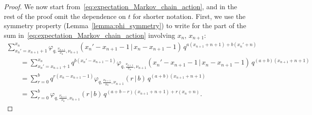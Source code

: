 \begin{proof}
	We now start from~\eqref{eq:expectation_Markov_chain_action}, and
	in the rest of the proof omit the dependence on $t$ for shorter notation.
	First, we use the symmetry property (Lemma~\ref{lemma:phi_symmetry})
	to write for the part of the sum in~\eqref{eq:expectation_Markov_chain_action}
	involving $x_n$, $x_{n+1}$:
	\begin{gather}
	\sum_{x_n'=x_{n+1}+1}^{x_n}
	\varphi_{q,\frac{\nu_{n+1}}{\nu_n},\nu_{n+1}}(x_n'-x_{n+1}-1\,|\, x_n-x_{n+1}-1)
	\,q^{a(x_{n+1}+n+1)+b(x_n'+n)}\nonumber
	\\[-.5ex] \qquad
{}=	\sum_{x_n'=x_{n+1}+1}^{x_n}	\!\!\! q^{b(x_n'-x_{n+1}-1)}
	\varphi_{q,\frac{\nu_{n+1}}{\nu_n},\nu_{n+1}}
	(x_n'-x_{n+1}-1\,|\, x_n-x_{n+1}-1)	\,q^{(a+b)(x_{n+1}+n+1)}\nonumber
	\\[-.5ex] \qquad
{}=	\sum_{r=0}^{b}	q^{r(x_n-x_{n+1}-1)}	\varphi_{q,\frac{\nu_{n+1}}{\nu_n},\nu_{n+1}}
	(r\,|\, b)	\,q^{(a+b)(x_{n+1}+n+1)}\nonumber
	\\[-.5ex] \qquad
{}=	\sum_{r=0}^{b}	\varphi_{q,\frac{\nu_{n+1}}{\nu_n},\nu_{n+1}}
	(r\,|\, b)	\,q^{(a+b-r)(x_{n+1}+n+1)+r(x_n+n)}.
	\label{eq:duality_computation_for_ptransition}
	\end{gather}


\end{proof}
